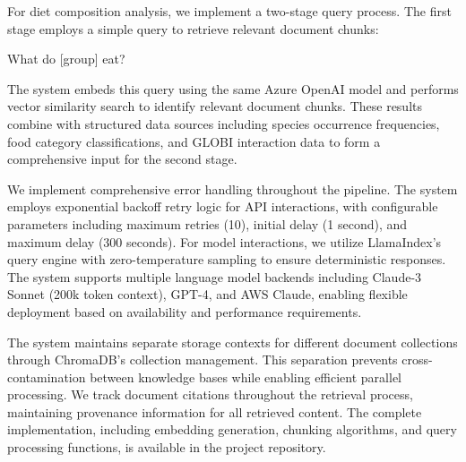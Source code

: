   For diet composition analysis, we implement a two-stage query process. The first stage employs a simple query to retrieve relevant document chunks:
  
  \begin{prompt}
  What do [group] eat?
  \end{prompt}
  
  The system embeds this query using the same Azure OpenAI model and performs vector similarity search to identify relevant document chunks. These results combine with structured data sources including species occurrence frequencies, food category classifications, and GLOBI interaction data to form a comprehensive input for the second stage.
  
  We implement comprehensive error handling throughout the pipeline. The system employs exponential backoff retry logic for API interactions, with configurable parameters including maximum retries (10), initial delay (1 second), and maximum delay (300 seconds). For model interactions, we utilize LlamaIndex's query engine with zero-temperature sampling to ensure deterministic responses. The system supports multiple language model backends including Claude-3 Sonnet (200k token context), GPT-4, and AWS Claude, enabling flexible deployment based on availability and performance requirements.
  
  The system maintains separate storage contexts for different document collections through ChromaDB's collection management. This separation prevents cross-contamination between knowledge bases while enabling efficient parallel processing. We track document citations throughout the retrieval process, maintaining provenance information for all retrieved content. The complete implementation, including embedding generation, chunking algorithms, and query processing functions, is available in the project repository.
  
